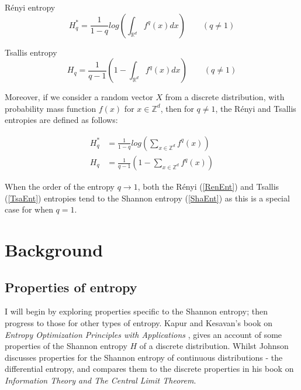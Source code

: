 \documentclass[12pt]{report}
\begin{document}
R\'enyi entropy
\begin{equation} \label{RenEnt} 
H_{q}^{*} = \frac{1}{1-q} log \left( \int_{\mathbb{R}^d} f^q (x) dx \right) \quad  \quad (q \neq 1) 
\end{equation}

Tsallis entropy
\begin{equation} \label{TsaEnt} 
H_{q} = \frac{1}{q-1} \left(1 - \int_{\mathbb{R}^d} f^q (x) dx \right)  \quad  \quad (q \neq 1) 
\end{equation} 

Moreover, if we consider a random vector $X$ from a discrete distribution, with probability mass function $f(x)$ for $x \in \mathbb{Z}^d$, then for $q \neq 1$, the R\'enyi and Tsallis entropies are defined as follows:

\begin{align*}
H_{q}^{*} &=  \frac{1}{1-q} log \left( \sum_{x \in \mathbb{Z}^{d}} f^q (x) \right) \\
H_{q} &=  \frac{1}{q-1} \left(1 - \sum_{x \in \mathbb{Z}^d} f^q (x) \right)  
\end{align*}

When the order of the entropy $q \to 1$, both the R\'enyi (\ref{RenEnt}) and Tsallis (\ref{TsaEnt}) entropies tend to the Shannon entropy (\ref{ShaEnt}) as this is a special case for when $q=1$. 



\section{Background}


\subsection{Properties of entropy} \label{entropyProperties}

I will begin by exploring properties specific to the Shannon entropy; then progress to those for other types of entropy. Kapur and Kesavan's book on \textit{Entropy Optimization Principles with Applications} \cite{paper8}, gives an account of some properties of the Shannon entropy $H$ of a discrete distribution. Whilst Johnson \cite{book1} discusses properties for the Shannon entropy of continuous distributions - the differential entropy, and compares them to the discrete properties in his book on \textit{Information Theory and The Central Limit Theorem}.
\end{document}
